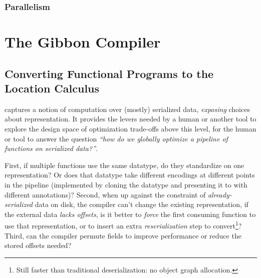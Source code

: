 \documentclass[showabstract,showacknowledgments,showpreface,showdedication]{iuphd}
\theoremstyle{nonumberplain}
\begin{document}
\subsection{Parallelism}\label{subsec:parallelism}



\chapter{The Gibbon Compiler}\label{chapter:gibbon}

\section{Converting Functional Programs to the Location Calculus}\label{sec:infer-local}

\ourcalc captures a notion of computation over (mostly) serialized data,
\emph{exposing} choices about representation. It provides the levers needed by a human
or another tool to explore the design space of optimization trade-offs above
this level, \ie{} for the human or tool to answer the question
\emph{``how do we globally optimize a pipeline of functions on serialized data?''}.

   First, if multiple functions use the same datatype, do they standardize on one
    representation?  Or does that datatype take different encodings at different
    points in the pipeline (implemented by cloning the datatype and
    presenting it to \ourcalc with different annotations)?
%    
    Second, when up against the constraint of {\em already-serialized} data on
    disk, the compiler can't change the existing representation, if the
    external data \emph{lacks offsets}, is it better to \emph{force}
    the first consuming function to use that representation, or to insert an
    extra {\em reserialization} step to convert\footnote{Still faster
    than traditional deserialization: no object graph allocation.}?
%
    Third, can the compiler permute fields to improve performance or reduce the
    stored offsets needed?
\end{document}
